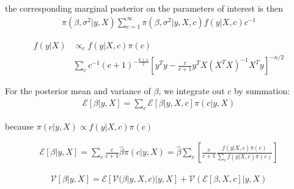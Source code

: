 \documentclass{article}
\begin{document}
the corresponding marginal posterior on the parameters of interest is then
\begin{equation}
\begin{aligned}
    \pi(\beta,\sigma^2|y,X) \sum_{c=1}^{\infty} \pi(\beta,\sigma^{2}|y,X,c)f(y|X,c)c^{-1}
\end{aligned}
\end{equation}

\begin{equation}
\begin{aligned}
    f(y|X) &\propto_{c} f(y|X,c)\pi(c) \\
    & \sum_{c}c^{-1}(c+1)^{-\frac{k+1}{2}} [y^T y-\frac{c}{c+1}y^T X(X^T X)^{-1} X^{T} y]^{-n/2}
\end{aligned}
\end{equation}

For the posterior mean and variance of $\beta$, we integrate out $c$ by summation:
\begin{equation}
\begin{aligned}
    \mathcal{E}[\beta|y,X] = \sum_{c}\mathcal{E}[\beta|y,X,c]\pi(c|y,X)
\end{aligned}
\end{equation}

because $\pi(c|y,X) \propto f(y|X,c) \pi(c)$

\begin{equation}
\begin{aligned}
    \mathcal{E}[\beta|y,X] = \sum_{c} \frac{c}{c+1} \hat{\beta} \pi(c|y,X) = \hat{\beta} \sum_{c} [\frac{c}{c+1}\frac{f(y|X,c)\pi(c)}{\sum_{c}f(y|X,c)\pi(c)}]
\end{aligned}
\end{equation}

\begin{equation}
\begin{aligned}
    \mathcal{V}[\beta|y,X] = \mathcal{E}[\mathcal{V}(\beta|y,X,c)|y,X] + \mathcal{V}(\mathcal{E}[\beta,X,c]|y,X)
\end{aligned}
\end{equation}
\end{document}

